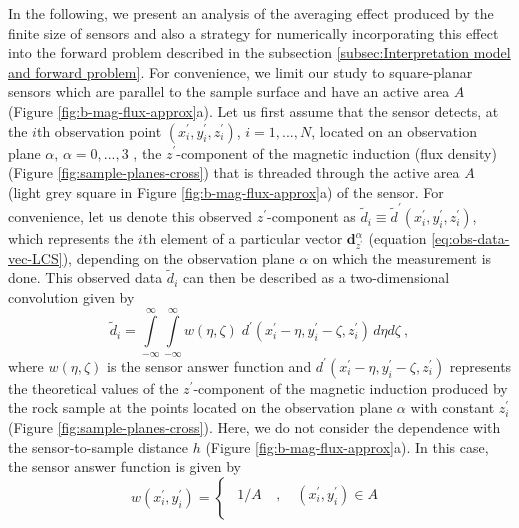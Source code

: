 \documentclass[galley,gc]{agutex}
\begin{document}
\begin{article}
In the following, we present an analysis of the averaging effect produced
by the finite size of sensors and also a strategy
for numerically incorporating this effect into the forward 
problem described in the subsection 
\ref{subsec:Interpretation model and forward problem}. 
For convenience, we limit our study to square-planar 
sensors which are parallel to the sample surface and have an
active area $A$ (Figure \ref{fig:b-mag-flux-approx}a).
Let us first assume that the sensor detects,
at the $i$th observation point $(x^{\prime}_{i}, y^{\prime}_{i}, z^{\prime}_{i})$, 
$i = 1, ..., N$, located on an observation plane $\alpha$,
$\alpha = 0, ..., 3$ , the $z^{\prime}$-component of 
the magnetic induction (flux density) 
(Figure \ref{fig:sample-planes-cross}) that is 
threaded through the active area $A$ 
(light grey square in Figure \ref{fig:b-mag-flux-approx}a)
of the sensor.
For convenience, let us denote this observed $z^{\prime}$-component
as $\tilde{d}_{i} \equiv \tilde{d}^{\prime}(x^{\prime}_{i}, y^{\prime}_{i}, z^{\prime}_{i})$,
which represents the $i$th element of a particular vector 
$\mathbf{d}^{\alpha}_{z^{\prime}}$ (equation \ref{eq:obs-data-vec-LCS}),
depending on the observation plane $\alpha$ on 
which the measurement is done.
This observed data $\tilde{d}_{i}$ can then be described as a 
two-dimensional convolution given by
\begin{equation}
\tilde{d}_{i} = 
\int \limits_{-\infty}^{\infty} \int \limits_{-\infty}^{\infty}
w(\eta, \zeta) \; d^{\prime}(x^{\prime}_{i} - \eta, 
                             y^{\prime}_{i} - \zeta,
                             z^{\prime}_{i}) \, d\eta d\zeta \: ,
\label{eq:b-mag-flux}
\end{equation}
where $w(\eta, \zeta)$ is the sensor answer function \citep{egli2000}
and $d^{\prime}(x^{\prime}_{i} - \eta, y^{\prime}_{i} - \zeta, z^{\prime}_{i})$
represents the theoretical values of the $z^{\prime}$-component of 
the magnetic induction produced by the rock sample at the points located on 
the observation plane $\alpha$ with constant 
$z^{\prime}_{i}$ (Figure \ref{fig:sample-planes-cross}).
Here, we do not consider the
dependence with the sensor-to-sample distance $h$ 
(Figure \ref{fig:b-mag-flux-approx}a).
In this case, the sensor answer function 
is given by \citep{egli2000}
\begin{equation}
w(x^{\prime}_{i}, y^{\prime}_{i}) = \begin{cases}
\begin{split}
1/A &\: , \quad (x^{\prime}_{i}, y^{\prime}_{i}) \in A \\

\end{split}
\end{cases}
\end{equation}
\end{article}
\end{document}
